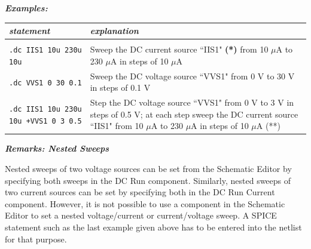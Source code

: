 \vspace{0.5\parskip}
\vspace{0.5\parskip}

\textbf{\textit{Examples:}}

\begin{tabular}{p{5cm}p{8cm}}
\textit{statement} & \textit{explanation} \\ \hline \\ \vspace{-0.8\parskip} 
\texttt{.dc IIS1 10u 230u 10u} & {\small Sweep the DC current source \textsf{``IIS1"} \textbf{(*)} from 10 $\mu$A to 230 $\mu$A in steps of 10 $\mu$A} \\
\texttt{.dc VVS1 0 30 0.1} & {\small Sweep the DC voltage source \textsf{``VVS1"} from 0 V to 30 V in steps of 0.1 V} \\
\texttt{.dc IIS1 10u 230u 10u \newline +VVS1 0 3 0.5} & {\small Step the DC voltage source \textsf{``VVS1"} from 0 V to 3 V in steps of 0.5 V; at each step sweep the DC current source \textsf{``IIS1"} from 10 $\mu$A to 230 $\mu$A in steps of 10 $\mu$A} {(**)}
\end{tabular}


\textbf{\textit{Remarks: Nested Sweeps}}

Nested sweeps of two voltage sources can be set from the Schematic Editor by specifying both sweeps in the DC Run component.  Similarly, nested sweeps of two current sources can be set by specifying both in the DC Run Current component.  However, it is not possible to use a component in the Schematic Editor to set a nested voltage/current or current/voltage sweep.  A SPICE statement such as the last example given above has to be entered into the netlist for that purpose.

